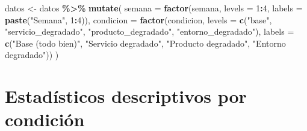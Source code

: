 \documentclass[
  spanish,
]{article}
\newenvironment{Shaded}{\begin{snugshade}}{\end{snugshade}}
\newcommand{\AttributeTok}[1]{\textcolor[rgb]{0.13,0.29,0.53}{#1}}
\newcommand{\DecValTok}[1]{\textcolor[rgb]{0.00,0.00,0.81}{#1}}
\newcommand{\FunctionTok}[1]{\textcolor[rgb]{0.13,0.29,0.53}{\textbf{#1}}}
\newcommand{\NormalTok}[1]{#1}
\newcommand{\OtherTok}[1]{\textcolor[rgb]{0.56,0.35,0.01}{#1}}
\newcommand{\SpecialCharTok}[1]{\textcolor[rgb]{0.81,0.36,0.00}{\textbf{#1}}}
\newcommand{\StringTok}[1]{\textcolor[rgb]{0.31,0.60,0.02}{#1}}
\begin{document}
\begin{Shaded}
\begin{Highlighting}[]
\NormalTok{datos }\OtherTok{\textless{}{-}}\NormalTok{ datos }\SpecialCharTok{\%\textgreater{}\%}
  \FunctionTok{mutate}\NormalTok{(}
    \AttributeTok{semana    =} \FunctionTok{factor}\NormalTok{(semana, }\AttributeTok{levels =} \DecValTok{1}\SpecialCharTok{:}\DecValTok{4}\NormalTok{,}
                       \AttributeTok{labels =} \FunctionTok{paste}\NormalTok{(}\StringTok{"Semana"}\NormalTok{, }\DecValTok{1}\SpecialCharTok{:}\DecValTok{4}\NormalTok{)),}
    \AttributeTok{condicion =} \FunctionTok{factor}\NormalTok{(condicion,}
                       \AttributeTok{levels =} \FunctionTok{c}\NormalTok{(}\StringTok{"base"}\NormalTok{,}
                                  \StringTok{"servicio\_degradado"}\NormalTok{,}
                                  \StringTok{"producto\_degradado"}\NormalTok{,}
                                  \StringTok{"entorno\_degradado"}\NormalTok{),}
                       \AttributeTok{labels =} \FunctionTok{c}\NormalTok{(}\StringTok{"Base (todo bien)"}\NormalTok{,}
                                  \StringTok{"Servicio degradado"}\NormalTok{,}
                                  \StringTok{"Producto degradado"}\NormalTok{,}
                                  \StringTok{"Entorno degradado"}\NormalTok{))}
\NormalTok{  )}
\end{Highlighting}
\end{Shaded}

\section{Estadísticos descriptivos por
condición}\label{estaduxedsticos-descriptivos-por-condiciuxf3n}
\end{document}
